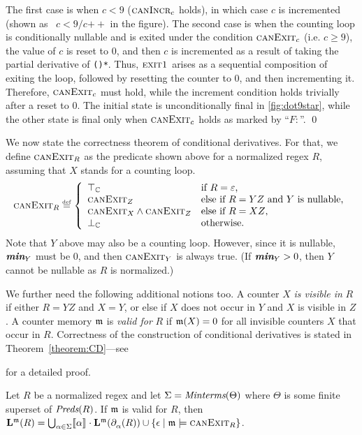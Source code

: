\documentclass[acmsmall,screen]{acmart}
\newif\ifTR
\begin{document}
The first
case is when $c < 9$ ($\textsc{canIncr}_{c}$ holds), in which case $c$ is
incremented (shown as \ $c< 9/ c\mathtt{++}$ in the figure). The
second case is when the counting loop is conditionally nullable and is exited
under the condition  $\textsc{canExit}_{c}$ (i.e. $c\geq 9$), the value of $c$ is
reset to 0, and then $c$ is incremented as a result of taking the partial
derivative of \texttt{(\DOT{}\rightbrace)*}.  Thus, $\textsc{exit1}_{{}}$
arises as a sequential composition of exiting the loop, followed by resetting
the counter to $0$, and then incrementing it. Therefore, $\textsc{canExit}_{c}$ must
hold, while the increment condition holds trivially after a reset to $0$.  The
initial state is unconditionally final in 
\cref{fig:dot9star}, 
while the
other state is final only when $\textsc{canExit}_{c}$ holds as marked by ``$F:$''.
\qed
\medskip

We now state the correctness theorem of conditional derivatives.
%
For that, we define $\textsc{canExit}_{R}$ as the predicate shown above for a
normalized regex $R$, assuming that $X$ stands for a counting loop.
\[
\CanExit{R}\eqdef
\left\{
\begin{array}{ll}
  \top_{\CC} & \textrm{if $R=\emp$,}\\
  \CanExit{Z} & \textrm{else if $R=YZ$ and $Y$ is nullable,}\\
    \CanExit{X}\wedge\CanExit{Z} &\textrm{else if $R=XZ$,}\\
  \bot_{\CC} & \textrm{otherwise.}
\end{array}
\right.
\]
%
Note that $Y$ above may also be a counting loop.
%
However, since it is nullable, $\textit{\textbf{min}}_{Y}$ must be $0$, and then $\textsc{canExit}_{Y}$ is
always true.
%
(If $\textit{\textbf{min}}_{Y}>0$, then $Y$ cannot be nullable as $R$ is normalized.)

We further need the following additional notions too.
%
A counter $X$ \emph{is visible in} $R$ if either $R=YZ$ and $X=Y$, or else if
$X$ does not occur in $Y$ and $X$ is visible in $Z$.
%
A counter memory $\mathfrak{m}$ is \emph{valid for} $R$ if $\mathfrak{m}(X)=0$ for all invisible
counters $X$ that occur in $R$.
%
Correctness of the construction of conditional derivatives is stated in
Theorem~\ref{theorem:CD}---see
\ifTR
Appendix~\ref{app:thmCD}
\else
\cite{OOPSLA20TR}
\fi
for a detailed proof. 


\begin{theorem}
  \label{theorem:CD}
Let $R$ be a normalized regex and let $\Sigma = \textit{Minterms}(\Theta)$
where $\Theta$ is some finite superset of $\textit{Preds}(R)$. 
  If $\mathfrak{m}$ is valid for $R$, then
  $\mathbf{L}^{\mathfrak{m}}(R) = \bigcup_{\alpha\in\Sigma}[\![\alpha]\!]_{{}}\cdot
  \mathbf{L}^{\mathfrak{m}}(\partial_{\alpha}^{{}}(R))\cup\{\epsilon\mid \mathfrak{m}\models\textsc{canExit}_{R}\}$.
\end{theorem}
\end{document}
